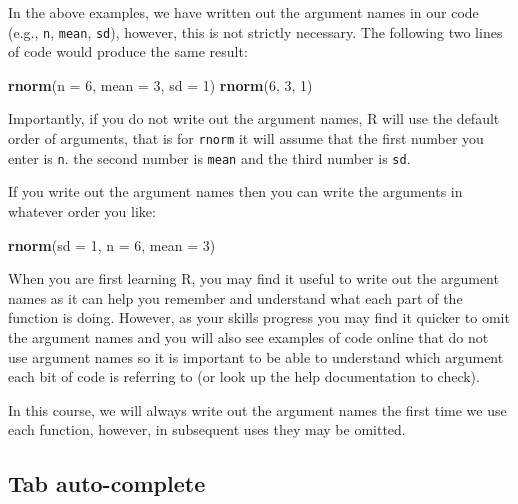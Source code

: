 \documentclass[]{book}
\newenvironment{Shaded}{\begin{snugshade}}{\end{snugshade}}
\newcommand{\DataTypeTok}[1]{\textcolor[rgb]{0.13,0.29,0.53}{#1}}
\newcommand{\DecValTok}[1]{\textcolor[rgb]{0.00,0.00,0.81}{#1}}
\newcommand{\KeywordTok}[1]{\textcolor[rgb]{0.13,0.29,0.53}{\textbf{#1}}}
\newcommand{\NormalTok}[1]{#1}
\begin{document}
In the above examples, we have written out the argument names in our code (e.g., \texttt{n}, \texttt{mean}, \texttt{sd}), however, this is not strictly necessary. The following two lines of code would produce the same result:

\begin{Shaded}
\begin{Highlighting}[]
\KeywordTok{rnorm}\NormalTok{(}\DataTypeTok{n =} \DecValTok{6}\NormalTok{, }\DataTypeTok{mean =} \DecValTok{3}\NormalTok{, }\DataTypeTok{sd =} \DecValTok{1}\NormalTok{)}
\KeywordTok{rnorm}\NormalTok{(}\DecValTok{6}\NormalTok{, }\DecValTok{3}\NormalTok{, }\DecValTok{1}\NormalTok{)}
\end{Highlighting}
\end{Shaded}

Importantly, if you do not write out the argument names, R will use the default order of arguments, that is for \texttt{rnorm} it will assume that the first number you enter is \texttt{n}. the second number is \texttt{mean} and the third number is \texttt{sd}.

If you write out the argument names then you can write the arguments in whatever order you like:

\begin{Shaded}
\begin{Highlighting}[]
\KeywordTok{rnorm}\NormalTok{(}\DataTypeTok{sd =} \DecValTok{1}\NormalTok{, }\DataTypeTok{n =} \DecValTok{6}\NormalTok{, }\DataTypeTok{mean =} \DecValTok{3}\NormalTok{)}
\end{Highlighting}
\end{Shaded}

When you are first learning R, you may find it useful to write out the argument names as it can help you remember and understand what each part of the function is doing. However, as your skills progress you may find it quicker to omit the argument names and you will also see examples of code online that do not use argument names so it is important to be able to understand which argument each bit of code is referring to (or look up the help documentation to check).

In this course, we will always write out the argument names the first time we use each function, however, in subsequent uses they may be omitted.

\hypertarget{tab-auto-complete}{%
\subsection{Tab auto-complete}\label{tab-auto-complete}}
\end{document}
